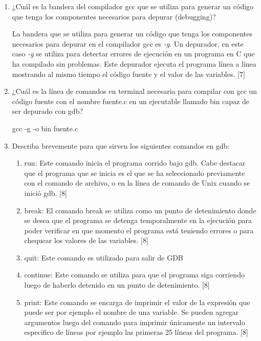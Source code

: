 \documentclass[12pt,a4paper]{article}
\begin{document}
\begin{enumerate}

\item ¿Cuál es la bandera del compilador gcc que se utiliza para generar un código que tenga los componentes
necesarios para depurar (debugging)?

La bandera que se utiliza para generar un código que tenga los componentes necesarios para depurar en el compilador gcc es \textit{-g}. Un depurador, en este caso \textit{-g} se utiliza para detectar errores de ejecución en un programa en C que ha compilado sin problemas. Este depurador ejecuta el programa línea a línea mostrando al mismo tiempo el código fuente y el valor de las variables. [7]

\item ¿Cuál es la línea de comandos en terminal necesaria para compilar con gcc un código fuente con el nombre fuente.c en un ejecutable llamado bin capaz de ser depurado con gdb?

gcc -g -o bin fuente.c

\item Describa brevemente para que sirven los siguientes comandos en gdb:
    \begin{enumerate}
    
    \item run: Este comando inicia el programa corrido bajo gdb. Cabe destacar que el programa que se inicia es el que se ha seleccionado previamente con el comando de archivo, o en la línea de comando de Unix cuando se inició gdb. [8]
    
    \item break: El comando break se utiliza como un punto de detenimiento donde se desea que el programa se detenga temporalmente en la ejecución para poder verificar en que momento el programa está teniendo errores o para chequear los valores de las variables. [8]
    
    \item quit: Este comando es utilizado para salir de GDB
    
    \item continue: Este comando se utiliza para que el programa siga corriendo luego de haberlo detenido en un punto de detenimiento. [8]
    
    \item print: Este comando se encarga de imprimir el valor de la expresión que puede ser por ejemplo el nombre de una variable. Se pueden agregar argumentos luego del comando para imprimir únicamente un intervalo especifico de líneas por ejemplo las primeras 25 líneas del programa. [8]
        
    \end{enumerate}


\end{enumerate}
\end{document}
